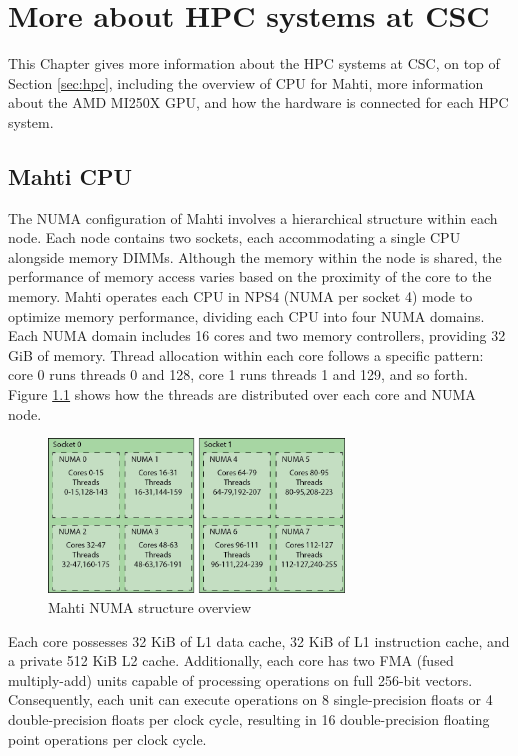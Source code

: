 \chapter{More about HPC systems at CSC}
This Chapter gives more information about the HPC systems at CSC, on top of Section \ref{sec:hpc}, including the overview of CPU for Mahti, more information about the AMD MI250X GPU, and how the hardware is connected for each HPC system.

\section{Mahti CPU}
The NUMA configuration of Mahti \cite{mahti} involves a hierarchical structure within each node. Each node contains two sockets, each accommodating a single CPU alongside memory DIMMs. Although the memory within the node is shared, the performance of memory access varies based on the proximity of the core to the memory. Mahti operates each CPU in NPS4 (NUMA per socket 4) mode to optimize memory performance, dividing each CPU into four NUMA domains. Each NUMA domain includes 16 cores and two memory controllers, providing 32 GiB of memory. Thread allocation within each core follows a specific pattern: core 0 runs threads 0 and 128, core 1 runs threads 1 and 129, and so forth. Figure \ref{fig_mahti_numa} shows how the threads are distributed over each core and NUMA node.

\begin{figure}[H]
    \centering
    \includegraphics[width=0.7\textwidth]{figures/mahti_numa.png}
    \caption{Mahti NUMA structure overview \cite{mahti}}
    \label{fig_mahti_numa}
\end{figure}

Each core possesses 32 KiB of L1 data cache, 32 KiB of L1 instruction cache, and a private 512 KiB L2 cache. Additionally, each core has two FMA (fused multiply-add) units capable of processing operations on full 256-bit vectors. Consequently, each unit can execute operations on 8 single-precision floats or 4 double-precision floats per clock cycle, resulting in 16 double-precision floating point operations per clock cycle.

